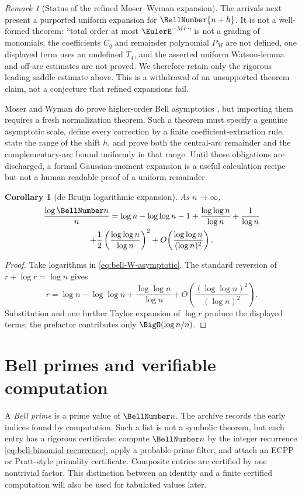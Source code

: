 \documentclass[11pt,a4paper,oneside,openany]{book}
\newtheorem{corollary}[theorem]{Corollary}
\theoremstyle{definition}
\theoremstyle{remark}
\newtheorem{remark}[theorem]{Remark}
\begin{document}
\begin{remark}[Status of the refined Moser--Wyman expansion]
The arrivals next present a purported uniform expansion for $\BellNumber{n+h}$.
It is not a well-formed theorem: ``total order at most $\EulerE^{-Mr}$'' is not a
grading of monomials, the coefficients $C_q$ and remainder polynomial $P_M$ are
not defined, one displayed term uses an undefined $T_4$, and the asserted
uniform Watson-lemma and off-arc estimates are not proved.  We therefore retain
only the rigorous leading saddle estimate above.  This is a withdrawal of an
unsupported theorem claim, not a conjecture that refined expansions fail.

Moser and Wyman do prove higher-order Bell asymptotics
\cite{MoserWyman1955}, but importing them requires a fresh normalization theorem.
Such a theorem must specify a genuine asymptotic scale, define every correction by
a finite coefficient-extraction rule, state the range of the shift $h$, and prove
both the central-arc remainder and the complementary-arc bound uniformly in that
range.  Until those obligations are discharged, a formal Gaussian-moment expansion
is a useful calculation recipe but not a human-readable proof of a uniform
remainder.
\end{remark}

\begin{corollary}[de Bruijn logarithmic expansion]\label{cor:bell-debruijn}
As $n\to\infty$,
\begin{multline}\label{eq:bell-debruijn}
 \frac{\log\BellNumber n}{n}
 =\log n-\log\log n-1
 +\frac{\log\log n}{\log n}+\frac1{\log n}\\
 +\frac12\left(\frac{\log\log n}{\log n}\right)^2
 +O\!\left(\frac{\log\log n}{(\log n)^2}\right).
\end{multline}
\end{corollary}
\begin{proof}
Take logarithms in \eqref{eq:bell-W-asymptotic}.  The standard reversion of
$r+\log r=\log n$ gives
\[
 r=\log n-\log\log n+
\frac{\log\log n}{\log n}
 +O\!\left(\frac{(\log\log n)^2}{(\log n)^2}\right).
\]
Substitution and one further Taylor expansion of $\log r$ produce the displayed
terms; the prefactor contributes only $\BigO(\log n/n)$.
\end{proof}

\section{Bell primes and verifiable computation}
A \emph{Bell prime} is a prime value of $\BellNumber n$.  The archive records the early
indices found by computation.  Such a list is not a symbolic theorem, but each
entry has a rigorous certificate: compute $\BellNumber n$ by the integer recurrence
\eqref{eq:bell-binomial-recurrence}, apply a probable-prime filter, and attach an
ECPP or Pratt-style primality certificate.  Composite entries are certified by one
nontrivial factor.  This distinction between an identity and a finite certified
computation will also be used for tabulated values later.
\end{document}
